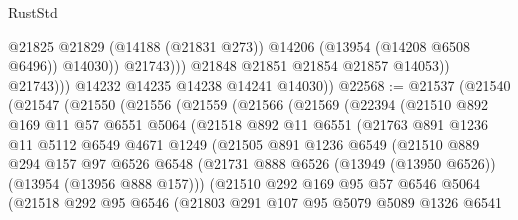 \begin{lexlean}{RustStd}
\begin{coremodule}
                            @21825
                            @21829
                            (@14188 (@21831 @273))
                            @14206
                            (@13954 (@14208 @6508 @6496))
                            @14030))
                        @21743)))
                  @21848
                  @21851
                  @21854
                  @21857
                  @14053))
              @21743)))
        @14232
        @14235
        @14238
        @14241
        @14030))
@22568 := @21537
    (@21540
      (@21547
        (@21550
          (@21556
            (@21559
              (@21566
                (@21569
                  (@22394
                    (@21510
                      @892
                      @169
                      @11
                      @57
                      @6551
                      @5064
                      (@21518
                        @892
                        @11
                        @6551
                        (@21763
                          @891
                          @1236
                          @11
                          @5112
                          @6549
                          @4671
                          @1249
                          (@21505
                            @891
                            @1236
                            @6549
                            (@21510
                              @889
                              @294
                              @157
                              @97
                              @6526
                              @6548
                              (@21731
                                @888
                                @6526
                                (@13949 (@13950 @6526))
                                (@13954 (@13956 @888 @157)))
                              (@21510
                                @292
                                @169
                                @95
                                @57
                                @6546
                                @5064
                                (@21518
                                  @292
                                  @95
                                  @6546
                                  (@21803
                                    @291
                                    @107
                                    @95
                                    @5079
                                    @5089
                                    @1326
                                    @6541

\end{coremodule}
\end{lexlean}
